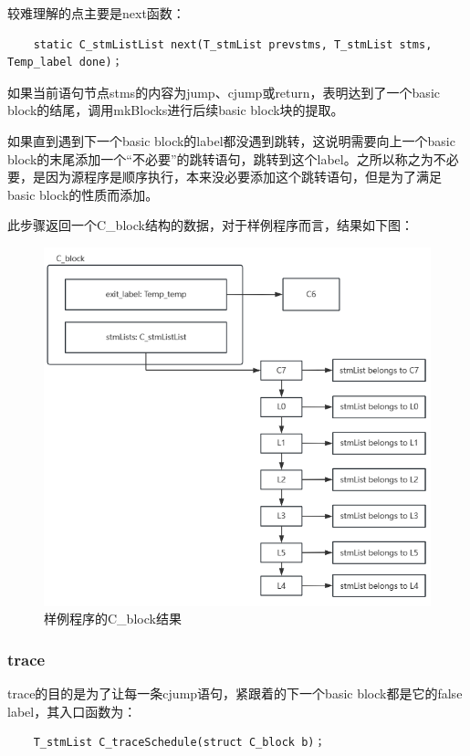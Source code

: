 \documentclass{article}
\begin{document}
较难理解的点主要是next函数：

    \begin{lstlisting}
    static C_stmListList next(T_stmList prevstms, T_stmList stms, Temp_label done)；
    \end{lstlisting}

如果当前语句节点stms的内容为jump、cjump或return，表明达到了一个basic block的结尾，调用mkBlocks进行后续basic block块的提取。

如果直到遇到下一个basic block的label都没遇到跳转，这说明需要向上一个basic block的末尾添加一个“不必要”的跳转语句，跳转到这个label。之所以称之为不必要，是因为源程序是顺序执行，本来没必要添加这个跳转语句，但是为了满足basic block的性质而添加。

此步骤返回一个C\_block结构的数据，对于样例程序而言，结果如下图：
\begin{figure}[h]
  \centering
  \includegraphics[width=.9\linewidth]{pics/c_block.jpg}
  \caption{样例程序的C\_block结果}
  \label{fig:cblk}
\end{figure}

\subsubsection{trace}
trace的目的是为了让每一条cjump语句，紧跟着的下一个basic block都是它的false label，其入口函数为：

    \begin{lstlisting}
    T_stmList C_traceSchedule(struct C_block b)；
    \end{lstlisting}
\end{document}
